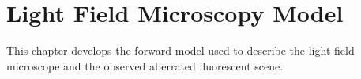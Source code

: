 \chapter{Light Field Microscopy Model}

This chapter develops the forward model used to describe the light field
microscope and the observed aberrated fluorescent scene.

